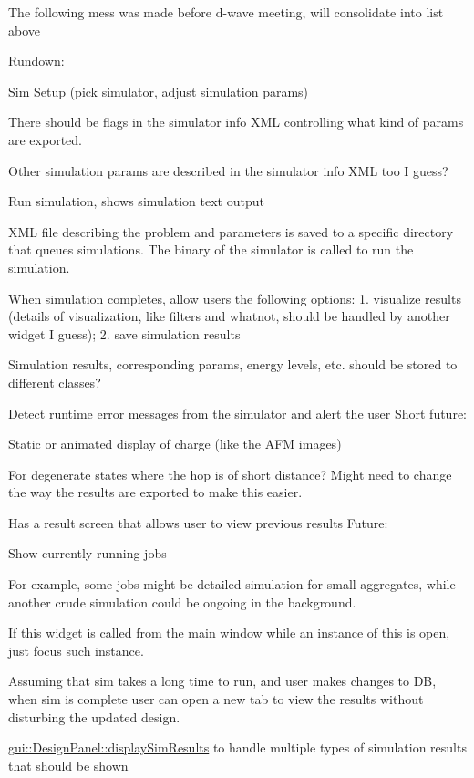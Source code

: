 The following mess was made before d-\/wave meeting, will consolidate into list above
\begin{DoxyItemize}
\item Rundown\+:
\begin{DoxyItemize}
\item Sim Setup (pick simulator, adjust simulation params)
\begin{DoxyItemize}
\item There should be flags in the simulator info X\+ML controlling what kind of params are exported.
\item Other simulation params are described in the simulator info X\+ML too I guess?
\end{DoxyItemize}
\item Run simulation, shows simulation text output
\begin{DoxyItemize}
\item X\+ML file describing the problem and parameters is saved to a specific directory that queues simulations. The binary of the simulator is called to run the simulation.
\end{DoxyItemize}
\item When simulation completes, allow users the following options\+: 1. visualize results (details of visualization, like filters and whatnot, should be handled by another widget I guess); 2. save simulation results
\begin{DoxyItemize}
\item Simulation results, corresponding params, energy levels, etc. should be stored to different classes?
\end{DoxyItemize}
\end{DoxyItemize}
\item Detect runtime error messages from the simulator and alert the user Short future\+:
\item Static or animated display of charge (like the A\+FM images)
\begin{DoxyItemize}
\item For degenerate states where the hop is of short distance? Might need to change the way the results are exported to make this easier.
\end{DoxyItemize}
\item Has a result screen that allows user to view previous results Future\+:
\item Show currently running jobs
\item For example, some jobs might be detailed simulation for small aggregates, while another crude simulation could be ongoing in the background.
\item If this widget is called from the main window while an instance of this is open, just focus such instance.
\item Assuming that sim takes a long time to run, and user makes changes to DB, when sim is complete user can open a new tab to view the results without disturbing the updated design.
\item \hyperlink{classgui_1_1DesignPanel_a559d39b09e6e02908d54dbbe79ed09d8}{gui\+::\+Design\+Panel\+::display\+Sim\+Results} to handle multiple types of simulation results that should be shown
\end{DoxyItemize}

